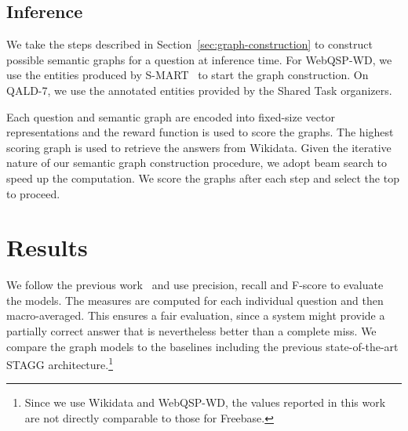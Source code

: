 \documentclass[11pt]{article}
\begin{document}
\subsection{Inference}
\label{sec:inference}

We take the steps described in Section~\ref{sec:graph-construction} to construct possible semantic graphs for a question at inference time. For WebQSP-WD, we use the entities produced by S-MART~\cite{Yang2015a} to start the graph construction. On QALD-7, we use the annotated entities provided by the Shared Task organizers.

Each question and semantic graph are encoded into fixed-size vector representations and the reward function  is used to score the graphs. The highest scoring graph is used to retrieve the answers from Wikidata. Given the iterative nature of our semantic graph construction procedure, we adopt beam search to speed up the computation. We score the graphs after each step and select the top  to proceed.

\section{Results}
\label{sec:results}

We follow the previous work~\cite{Berant2013} and use precision, recall and F-score to evaluate the models. The measures are computed for each individual question and then macro-averaged. This ensures a fair evaluation, since a system might provide a partially correct answer that is nevertheless better than a complete miss. We compare the graph models to the baselines including the previous state-of-the-art STAGG architecture.\footnote{Since we use Wikidata and WebQSP-WD, the values reported in this work are not directly comparable to those for Freebase.}
\end{document}
